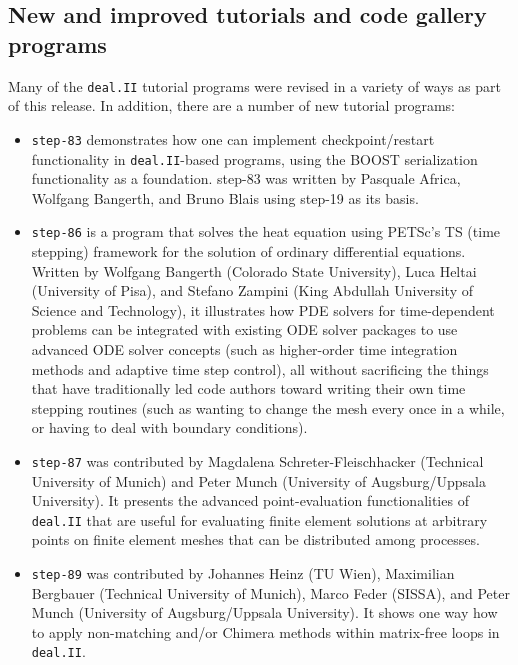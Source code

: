\documentclass{ansarticle-preprint}
\newcommand{\specialword}[1]{\texttt{#1}}
\newcommand{\dealii}{{\specialword{deal.II}}\xspace}
\begin{document}
\subsection{New and improved tutorials and code gallery programs}
\label{subsec:steps}

Many of the \dealii tutorial programs were revised in a variety of ways
as part of this release. In addition, there are a number of new tutorial
programs:
\begin{itemize}
  \item
    \texttt{step-83} 
    demonstrates how one can implement
    checkpoint/restart functionality in \dealii{}-based programs,
    using the BOOST serialization functionality as a
    foundation. step-83 was written by Pasquale Africa, Wolfgang
    Bangerth, and Bruno Blais using step-19 as its basis.
  \item
    \texttt{step-86}
    is a program that solves the heat equation using PETSc's TS (time
    stepping) framework for the solution of ordinary differential
    equations. Written by Wolfgang Bangerth (Colorado State
    University), Luca Heltai (University of Pisa), and Stefano Zampini
    (King Abdullah University of Science and Technology), it
    illustrates how PDE solvers for time-dependent problems can be
    integrated with existing ODE solver packages to use advanced ODE
    solver concepts (such as higher-order time integration methods and
    adaptive time step control), all without sacrificing the things
    that have traditionally led code authors toward writing their own
    time stepping routines (such as wanting to change the mesh every
    once in a while, or having to deal with boundary conditions).
  \item
    \texttt{step-87} was contributed by Magdalena Schreter-Fleischhacker
    (Technical University of Munich) and Peter Munch
    (University of Augsburg/Uppsala University). It
    presents the advanced point-evaluation functionalities of \dealii
    that are useful for evaluating finite element solutions at
    arbitrary points on finite element meshes that can be distributed among processes.
  \item
    \texttt{step-89} was contributed by Johannes Heinz (TU Wien),
    Maximilian Bergbauer (Technical University of Munich),
    Marco Feder (SISSA), and Peter Munch (University of Augsburg/Uppsala University).
    It shows one way how to apply non-matching and/or Chimera methods
    within matrix-free loops in \dealii.

\end{itemize}
\end{document}
